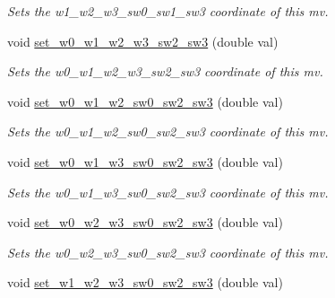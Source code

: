 \begin{DoxyCompactItemize}
\begin{DoxyCompactList}\small\item\em Sets the w1\-\_\-w2\-\_\-w3\-\_\-sw0\-\_\-sw1\-\_\-sw3 coordinate of this mv. \end{DoxyCompactList}\item 
\hypertarget{classe3ga_1_1mv_a7f95937b56691c2356390dc16c436ac0}{void \hyperlink{classe3ga_1_1mv_a7f95937b56691c2356390dc16c436ac0}{set\-\_\-w0\-\_\-w1\-\_\-w2\-\_\-w3\-\_\-sw2\-\_\-sw3} (double val)}\label{classe3ga_1_1mv_a7f95937b56691c2356390dc16c436ac0}

\begin{DoxyCompactList}\small\item\em Sets the w0\-\_\-w1\-\_\-w2\-\_\-w3\-\_\-sw2\-\_\-sw3 coordinate of this mv. \end{DoxyCompactList}\item 
\hypertarget{classe3ga_1_1mv_a184815b912e7a6d878d72c3c56dc8752}{void \hyperlink{classe3ga_1_1mv_a184815b912e7a6d878d72c3c56dc8752}{set\-\_\-w0\-\_\-w1\-\_\-w2\-\_\-sw0\-\_\-sw2\-\_\-sw3} (double val)}\label{classe3ga_1_1mv_a184815b912e7a6d878d72c3c56dc8752}

\begin{DoxyCompactList}\small\item\em Sets the w0\-\_\-w1\-\_\-w2\-\_\-sw0\-\_\-sw2\-\_\-sw3 coordinate of this mv. \end{DoxyCompactList}\item 
\hypertarget{classe3ga_1_1mv_a7804167cb8e9ae8fb8d0bb8af78ff5ae}{void \hyperlink{classe3ga_1_1mv_a7804167cb8e9ae8fb8d0bb8af78ff5ae}{set\-\_\-w0\-\_\-w1\-\_\-w3\-\_\-sw0\-\_\-sw2\-\_\-sw3} (double val)}\label{classe3ga_1_1mv_a7804167cb8e9ae8fb8d0bb8af78ff5ae}

\begin{DoxyCompactList}\small\item\em Sets the w0\-\_\-w1\-\_\-w3\-\_\-sw0\-\_\-sw2\-\_\-sw3 coordinate of this mv. \end{DoxyCompactList}\item 
\hypertarget{classe3ga_1_1mv_a1f4fac9d7dedf7b1fef6f17aac0febd7}{void \hyperlink{classe3ga_1_1mv_a1f4fac9d7dedf7b1fef6f17aac0febd7}{set\-\_\-w0\-\_\-w2\-\_\-w3\-\_\-sw0\-\_\-sw2\-\_\-sw3} (double val)}\label{classe3ga_1_1mv_a1f4fac9d7dedf7b1fef6f17aac0febd7}

\begin{DoxyCompactList}\small\item\em Sets the w0\-\_\-w2\-\_\-w3\-\_\-sw0\-\_\-sw2\-\_\-sw3 coordinate of this mv. \end{DoxyCompactList}\item 
\hypertarget{classe3ga_1_1mv_a0de607b62298e8dc857986904a309035}{void \hyperlink{classe3ga_1_1mv_a0de607b62298e8dc857986904a309035}{set\-\_\-w1\-\_\-w2\-\_\-w3\-\_\-sw0\-\_\-sw2\-\_\-sw3} (double val)}\label{classe3ga_1_1mv_a0de607b62298e8dc857986904a309035}


\end{DoxyCompactItemize}
